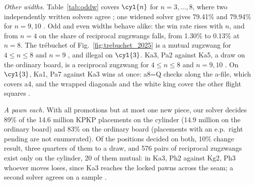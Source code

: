 \emph{Other widths.} Table~\ref{tab:oddw} covers $\cyl{n}$ for $n=3,\dots,8$, where two independently
written solvers agree ; one widened solver gives 79.41\% and 79.94\% for $n=9,10$ . Odd
and even widths behave alike: the win rate rises with $n$, and from $n=4$ on the share of reciprocal zugzwangs falls,
from 1.30\% to 0.13\% at $n=8$. The tr\'ebuchet of Fig.~\ref{fig:trebuchet_2025} is a mutual zugzwang for $4\le n\le8$  and $n=9$ , and illegal on $\cyl{3}$. Ka3, Pa2 against
Ka5, a draw on the ordinary board, is a reciprocal zugzwang for $4\le n\le8$  and $n=9,10$ . On $\cyl{3}$, Ka1, Pa7 against Ka3
wins at once: a8=Q checks along the a-file, which covers a4, and the wrapped diagonals and the white king cover
the other flight squares .

\emph{A pawn each.} With all promotions but at most one new piece, our solver decides 89\% of the 14.6 million
KPKP placements on the cylinder (14.9 million on the ordinary board) and 83\% on the ordinary board 
(placements with an e.p.\ right pending are not enumerated). Of the positions decided on both,
10\% change result, three quarters of them to a draw, and 576 pairs of reciprocal zugzwangs exist only on the
cylinder, 20 of them mutual: in Ka3, Ph2 against Kg2, Ph3 whoever moves loses, since Ka3 reaches the
locked pawns across the seam; a second solver agrees on a sample .
